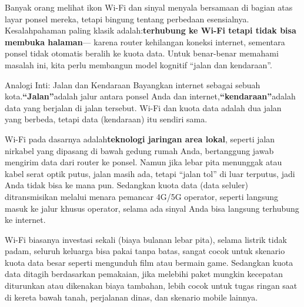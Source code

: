 


Banyak orang melihat ikon Wi-Fi dan sinyal menyala bersamaan di bagian atas layar ponsel mereka, tetapi bingung tentang perbedaan esensialnya. Kesalahpahaman paling klasik adalah:\textbf{terhubung ke Wi-Fi tetapi tidak bisa membuka halaman}— karena router kehilangan koneksi internet, sementara ponsel tidak otomatis beralih ke kuota data. Untuk benar-benar memahami masalah ini, kita perlu membangun model kognitif “jalan dan kendaraan”.

\begin{tcbinfo}{Analogi Inti: Jalan dan Kendaraan}
Bayangkan internet sebagai sebuah kota.\textbf{“Jalan”}adalah jalur antara ponsel Anda dan internet,\textbf{“kendaraan”}adalah data yang berjalan di jalan tersebut. Wi-Fi dan kuota data adalah dua jalan yang berbeda, tetapi data (kendaraan) itu sendiri sama.

\end{tcbinfo}


Wi-Fi pada dasarnya adalah\textbf{teknologi jaringan area lokal}, seperti jalan nirkabel yang dipasang di bawah gedung rumah Anda, bertanggung jawab mengirim data dari router ke ponsel. Namun jika lebar pita menunggak atau kabel serat optik putus, jalan masih ada, tetapi “jalan tol” di luar terputus, jadi Anda tidak bisa ke mana pun. Sedangkan kuota data (data seluler) ditransmisikan melalui menara pemancar 4G/5G operator, seperti langsung masuk ke jalur khusus operator, selama ada sinyal Anda bisa langsung terhubung ke internet.


Wi-Fi biasanya investasi sekali (biaya bulanan lebar pita), selama listrik tidak padam, seluruh keluarga bisa pakai tanpa batas, sangat cocok untuk skenario kuota data besar seperti mengunduh film atau bermain game. Sedangkan kuota data ditagih berdasarkan pemakaian, jika melebihi paket mungkin kecepatan diturunkan atau dikenakan biaya tambahan, lebih cocok untuk tugas ringan saat di kereta bawah tanah, perjalanan dinas, dan skenario mobile lainnya.

